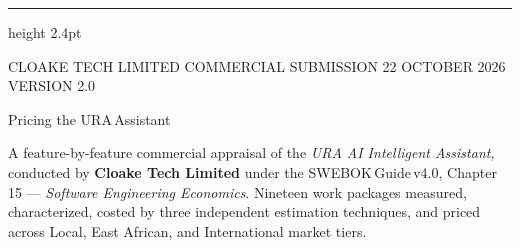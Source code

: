 \documentclass[10pt,a4paper]{article}
\begin{document}
\begin{titlepage}
\AddToShipoutPictureBG*{\AtPageLowerLeft{\color{ground}\rule{\paperwidth}{\paperheight}}}
\thispagestyle{empty}
{\color{ink}\hrule height 2.4pt}
\vspace{4mm}
{\fontsize{8.2}{10}\selectfont\textcolor{slate}{CLOAKE TECH LIMITED}%
 \hspace{6mm}\textcolor{inkiii}{COMMERCIAL SUBMISSION \textperiodcentered{} 22 OCTOBER 2026 \textperiodcentered{} VERSION 2.0}\par}

\vspace{38mm}
{\displayfont\fontsize{36}{36}\selectfont\textcolor{ink}{Pricing the URA\,Assistant}\par}
\vspace{8mm}
{\fontsize{12.5}{17}\selectfont\color{inkii}
\begin{minipage}{125mm}\RaggedRight
A feature-by-feature commercial appraisal of the \emph{URA AI Intelligent Assistant},
conducted by \textbf{Cloake Tech Limited} under the SWEBOK\,Guide\,v4.0, Chapter\,15 ---
\emph{Software Engineering Economics}. Nineteen work packages measured, characterized,
costed by three independent estimation techniques, and priced across Local, East African,
and International market tiers.
\end{minipage}\par}


\end{titlepage}
\end{document}
